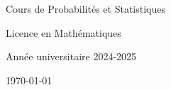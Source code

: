 \begin{titlepage}
    \centering
    \vspace*{1cm}

    \Huge
    Cours de Probabilités et Statistiques

    \vspace{0.5cm}

    \LARGE
    Licence en Mathématiques

    \vspace{1.5cm}


    \vfill

    \Large
    Année universitaire 2024-2025

    \vspace{0.8cm}

    \today
\end{titlepage}
